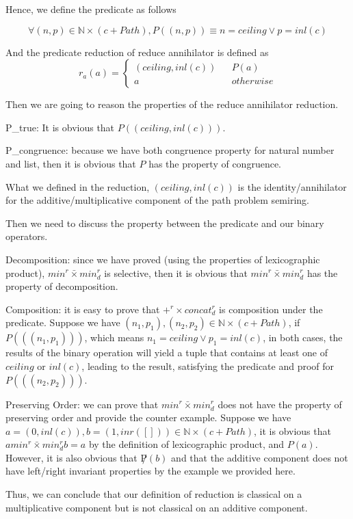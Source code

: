 \documentclass[a4paper,12pt,twoside,openright]{report}
\newcommand{\e}[2]{
\begin{equation}
  \label{#1} 
  #2
\end{equation}
}
\begin{document}
Hence, we define the predicate as follows 
\e{pr:def:reduce_annihilator_p}{\forall (n,p) \in \mathbb{N} \times (c + Path), P((n,p)) \equiv n = ceiling \vee p = inl(c)}
And the predicate reduction of reduce annihilator is defined as \e{pr:def:reduce_annihilator_r}{r_a(a) = \left\{
\begin{aligned}
(ceiling,inl (c)) &  & P(a) \\
a &  & otherwise 
\end{aligned}
\right.}

Then we are going to reason the properties of the reduce annihilator reduction.

P\_true: It is obvious that $P((ceiling,inl (c)))$.

P\_congruence: because we have both congruence property for natural number and list, then it is obvious that $P$ has the property of congruence.

What we defined in the reduction, $(ceiling,inl (c))$ is the identity/annihilator for the additive/multiplicative component of the path problem semiring.

Then we need to discuss the property between the predicate and our binary operators.

Decomposition: since we have proved (using the properties of lexicographic product), $min^r \bar{\times} min^r_d$ is selective, then it is obvious that $min^r \bar{\times} min^r_d$ has the property of decomposition.

Composition: it is easy to prove that $+^r \times concat^r_d$ is composition under the predicate. Suppose we have $(n_1,p_1),(n_2,p_2) \in \mathbb{N} \times (c + Path)$, if $P(((n_1,p_1)))$, which means $n_1 = ceiling \vee p_1 = inl(c)$, in both cases, the results of the binary operation will yield a tuple that contains at least one of $ceiling$ or $inl(c)$, leading to the result, satisfying the predicate and proof for $P(((n_2,p_2)))$.

Preserving Order: we can prove that $min^r \bar{\times} min^r_d$ does not have the property of preserving order and provide the counter example. Suppose we have $a = (0,inl (c)), b = (1,inr([])) \in \mathbb{N} \times (c + Path)$, it is obvious that $ a min^r \bar{\times} min^r_d b = a$ by the definition of lexicographic product, and $P(a)$. However, it is also obvious that $\not P(b)$ and that the additive component does not have left/right invariant properties by the example we provided here.

Thus, we can conclude that our definition of reduction is classical on a multiplicative component but is not classical on an additive component.
\end{document}

